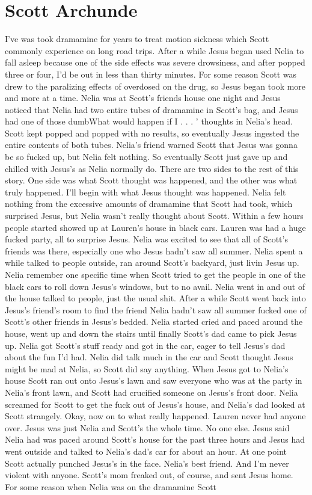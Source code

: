 \documentclass[12pt]{book}
\begin{document}
\chapter{Scott Archunde}

I've was took dramamine for years to treat motion sickness which Scott commonly experience on long road trips. After a while Jesus began used Nelia to fall asleep because one of the side effects was severe drowsiness, and after popped three or four, I'd be out in less than thirty minutes. For some reason Scott was drew to the paralizing effects of overdosed on the drug, so Jesus began took more and more at a time. Nelia was at Scott's friends house one night and Jesus noticed that Nelia had two entire tubes of dramamine in Scott's bag, and Jesus had one of those dumbWhat would happen if I . . .  ' thoughts in Nelia's head. Scott kept popped and popped with no results, so eventually Jesus ingested the entire contents of both tubes. Nelia's friend warned Scott that Jesus was gonna be so fucked up, but Nelia felt nothing. So eventually Scott just gave up and chilled with Jesus's as Nelia normally do. There are two sides to the rest of this story. One side was what Scott thought was happened, and the other was what truly happened. I'll begin with what Jesus thought was happened. Nelia felt nothing from the excessive amounts of dramamine that Scott had took, which surprised Jesus, but Nelia wasn't really thought about Scott. Within a few hours people started showed up at Lauren's house in black cars. Lauren was had a huge fucked party, all to surprise Jesus. Nelia was excited to see that all of Scott's friends was there, especially one who Jesus hadn't saw all summer. Nelia spent a while talked to people outside, ran around Scott's backyard, just livin Jesus up. Nelia remember one specific time when Scott tried to get the people in one of the black cars to roll down Jesus's windows, but to no avail. Nelia went in and out of the house talked to people, just the usual shit. After a while Scott went back into Jesus's friend's room to find the friend Nelia hadn't saw all summer fucked one of Scott's other friends in Jesus's bedded. Nelia started cried and paced around the house, went up and down the stairs until finally Scott's dad came to pick Jesus up. Nelia got Scott's stuff ready and got in the car, eager to tell Jesus's dad about the fun I'd had. Nelia did talk much in the car and Scott thought Jesus might be mad at Nelia, so Scott did say anything. When Jesus got to Nelia's house Scott ran out onto Jesus's lawn and saw everyone who was at the party in Nelia's front lawn, and Scott had crucified someone on Jesus's front door. Nelia screamed for Scott to get the fuck out of Jesus's house, and Nelia's dad looked at Scott strangely. Okay, now on to what really happened. Lauren never had anyone over. Jesus was just Nelia and Scott's the whole time. No one else. Jesus said Nelia had was paced around Scott's house for the past three hours and Jesus had went outside and talked to Nelia's dad's car for about an hour. At one point Scott actually punched Jesus's in the face. Nelia's best friend. And I'm never violent with anyone. Scott's mom freaked out, of course, and sent Jesus home. For some reason when Nelia was on the dramamine Scott 
\end{document}
